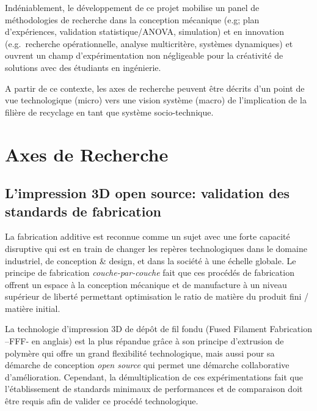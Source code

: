 \documentclass[
  12pt,
  oneside]{book}
\begin{document}
Indéniablement, le développement de ce projet mobilise un panel de méthodologies de recherche dans la conception mécanique (e.g; plan d'expériences, validation statistique/ANOVA, simulation) et en innovation (e.g.~recherche opérationnelle, analyse multicritère, systèmes dynamiques) et ouvrent un champ d'expérimentation non négligeable pour la créativité de solutions avec des étudiants en ingénierie.

A partir de ce contexte, les axes de recherche peuvent être décrits d'un point de vue technologique (micro) vers une vision système (macro) de l'implication de la filière de recyclage en tant que système socio-technique.

\hypertarget{axes-de-recherche}{%
\section{Axes de Recherche}\label{axes-de-recherche}}

\hypertarget{limpression-3d-open-source-validation-des-standards-de-fabrication}{%
\subsection{L'impression 3D open source: validation des standards de fabrication}\label{limpression-3d-open-source-validation-des-standards-de-fabrication}}

La fabrication additive est reconnue comme un sujet avec une forte capacité disruptive qui est en train de changer les repères technologiques dans le domaine industriel, de conception \& design, et dans la société à une échelle globale.
Le principe de fabrication \emph{couche-par-couche} fait que ces procédés de fabrication offrent un espace à la conception mécanique et de manufacture à un niveau supérieur de liberté permettant optimisation le ratio de matière du produit fini / matière initial.

La technologie d'impression 3D de dépôt de fil fondu (Fused Filament Fabrication --FFF- en anglais) est la plus répandue grâce à son principe d'extrusion de polymère qui offre un grand flexibilité technologique, mais aussi pour sa démarche de conception \emph{open source} qui permet une démarche collaborative d'amélioration.
Cependant, la démultiplication de ces expérimentations fait que l'établissement de standards minimaux de performances et de comparaison doit être requis afin de valider ce procédé technologique.
\end{document}

